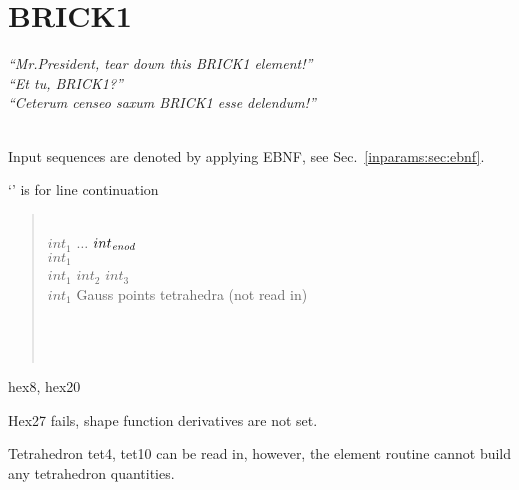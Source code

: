 



\chapter{BRICK1}
\begin{flushright}
\emph{``Mr.\@ President, tear down this BRICK1 element!''}\\
\emph{``Et tu, BRICK1?''}\\
\emph{``Ceterum censeo saxum BRICK1 esse delendum!''}
\end{flushright}

\\

Input sequences are denoted by applying EBNF, see Sec.~\ref{inparams:sec:ebnf}.

 `\cnl' is for line continuation
\begin{quote}
 \cnl \\
\cgb {} \cor {} \cge $int_1$ $\ldots$ $int_{\mathit{enod}}$ \cnl \\
 $int_1$ \cnl \\
 $int_1$ $int_2$ $int_3$ \cnl \\
 $int_1$ \cnl \chs Gauss points tetrahedra (not read in) \\
 \cgb {} \cor {} \cor {} \cor {} \cge \cnl \\
 \cgb {} \cor {} \cor {} \cge \cnl \\
 \cgb {} \cor {} \cor {} \cor {} \cor
{} \cor {} \cor {} \cor {} \cge \cnl \\
\ccb {} \cgb {} \cor {} \cor
{} \cge \cce
\end{quote}

 hex8, hex20

Hex27 fails, shape function derivatives are not set.

Tetrahedron tet4, tet10 can be read in, however, the element routine cannot
build any tetrahedron quantities.


